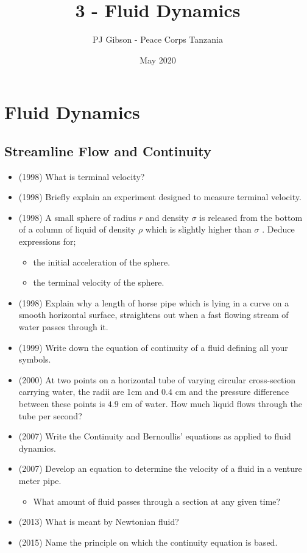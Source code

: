 \documentclass{article}
\title{\textbf{3 - Fluid Dynamics}}
\author{PJ Gibson - Peace Corps Tanzania}
\date{May 2020}
\newcommand{\mysection}[2]{\setcounter{section}{#1}\addtocounter{section}{-1}\section{#2}}
\begin{document}
\maketitle


\mysection{3}{Fluid Dynamics}

\subsection{Streamline Flow and Continuity}
\begin{itemize}
\item (1998)  What is terminal velocity?
\item (1998)  Briefly explain an experiment designed to measure terminal velocity.
\item (1998)  A small sphere of radius $ r$ and density $ \sigma $ is released from the bottom of a column of liquid of density $ \rho $ which is slightly higher than $ \sigma $ . Deduce expressions for;
 \begin{itemize}
\item the initial acceleration of the sphere.
\item the terminal velocity of the sphere.
\end{itemize}
\item (1998)  Explain why a length of horse pipe which is lying in a curve on a smooth horizontal surface, straightens out when a fast flowing stream of water passes through it.
\item (1999)  Write down the equation of continuity of a fluid defining all your symbols.
\item (2000)  At two points on a horizontal tube of varying circular cross-section carrying water, the radii are 1cm and $ 0.4$ cm and the pressure difference between these points is $ 4.9$ cm of water. How much liquid flows through the tube per second?
\item (2007)  Write the Continuity and Bernoullis’ equations as applied to fluid dynamics. 
\item (2007)  Develop an equation to determine the velocity of a fluid in a venture meter pipe.
 \begin{itemize}
\item What amount of fluid passes through a section at any given time? 
\end{itemize}
\item (2013)  What is meant by Newtonian fluid? 
\item (2015)  Name the principle on which the continuity equation is based.

\end{itemize}
\end{document}
